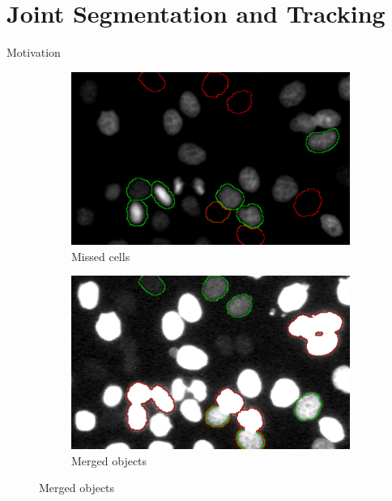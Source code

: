 \section{Joint Segmentation and Tracking}

\begin{frame}{Motivation}
    \begin{figure}
    \centering
    \begin{subfigure}[t]{0.48\textwidth}
        \includegraphics[width=\textwidth]{images/joint/mitocheck_255_max.pdf}
        \caption{Missed cells}
        \label{fig:joint-underseg-no-detection}
    \end{subfigure}
    \hfill
    \begin{subfigure}[t]{0.48\textwidth}
        \includegraphics[width=\textwidth]{images/joint/mitocheck_030_max.pdf}
        \caption{Merged objects}
        \label{fig:joint-underseg-mergers}
    \end{subfigure}
\end{figure}

\end{frame}

